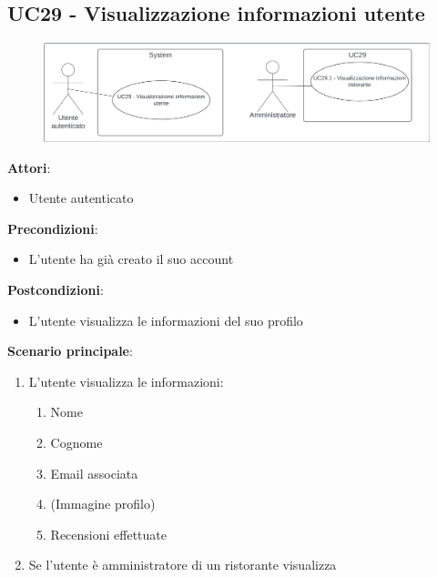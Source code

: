 \subsection{UC29 - Visualizzazione informazioni utente}\label{usecase:29}
\begin{figure}[H]
    \centering
    \includegraphics[width=0.9\linewidth]{ucd/UCD29.png}
\end{figure}
\textbf{Attori}:
\begin{itemize}
    \item Utente autenticato
\end{itemize}
\textbf{Precondizioni}:
\begin{itemize}
    \item L'utente ha già creato il suo account
\end{itemize}
\textbf{Postcondizioni}:
\begin{itemize}
    \item L'utente visualizza le informazioni del suo profilo
\end{itemize}
\textbf{Scenario principale}:
\begin{enumerate}
    \item L'utente visualizza le informazioni:
    \begin{enumerate}
        \item Nome
        \item Cognome
        \item Email associata
        \item (Immagine profilo)
        \item Recensioni effettuate
    \end{enumerate}
    \item Se l'utente è amministratore di un ristorante visualizza 
\end{enumerate}